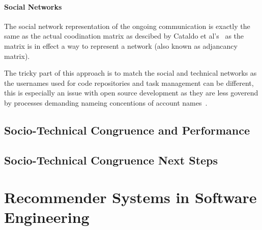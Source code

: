 \paragraph{Social Networks}
The social network representation of the ongoing communication is exactly the same as the actual coodination matrix as descibed by Cataldo et al's~\cite{} as the matrix is in effect a way to represent a network (also known as adjancancy matrix).

The tricky part of this approach is to match the social and technical networks as the usernames used for code repositories and task management can be different, this is especially an issue with open source development as they are less goverend by processes demanding nameing concentions of account names~\cite{}.

\subsection{Socio-Technical Congruence and Performance}
\subsection{Socio-Technical Congruence Next Steps}

\section{Recommender Systems in Software Engineering}
